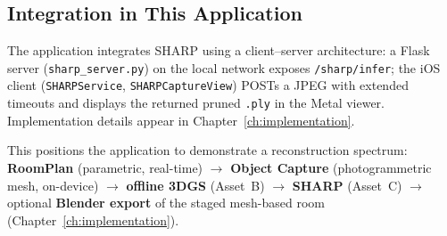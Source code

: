 \subsection{Integration in This Application}
\label{subsec:sharp_integration}

The application integrates SHARP using a client--server architecture: a Flask server (\texttt{sharp\_server.py}) on the local network exposes \texttt{/sharp/infer}; the iOS client (\texttt{SHARPService}, \texttt{SHARPCaptureView}) POSTs a JPEG with extended timeouts and displays the returned pruned \texttt{.ply} in the Metal viewer. Implementation details appear in Chapter~\ref{ch:implementation}.

This positions the application to demonstrate a reconstruction spectrum: \textbf{RoomPlan} (parametric, real-time) $\rightarrow$ \textbf{Object Capture} (photogrammetric mesh, on-device) $\rightarrow$ \textbf{offline 3DGS} (Asset~B) $\rightarrow$ \textbf{SHARP} (Asset~C) $\rightarrow$ optional \textbf{Blender export} of the staged mesh-based room (Chapter~\ref{ch:implementation}).
